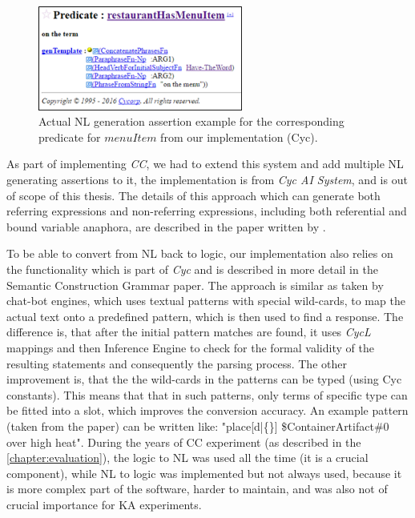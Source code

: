 \begin{figure}[h]
	\centering
		\includegraphics[width=0.6\textwidth]{figures/nlAssertion.png}
	\caption{Actual NL generation assertion example for the corresponding predicate for 
		$menuItem$ from our implementation (Cyc).}
	\label{fig:nlAssertion}
\end{figure}

As part of implementing \emph{CC}, we had
to extend this system and add multiple NL generating assertions to it, the
implementation is from \emph{Cyc AI System}, and is out of scope of this 
thesis. The details of this approach which can generate both referring 
expressions and non-referring expressions, including both referential and 
bound variable anaphora, are described in the paper written by
\textcite{Coppock2010}. 

To be able to convert from NL back to logic, our implementation also relies on
the functionality which is part of \emph{Cyc} and is described in more detail
in the Semantic Construction Grammar paper\parencite{Schneider2015}. The 
approach is similar as
taken by chat-bot engines\parencite{Wilcox2011}, which uses textual patterns
with special wild-cards, to map the actual text onto a predefined pattern, which
is then used to find a response. The difference is, that after the initial 
pattern matches are found, it uses \emph{CycL} mappings and then Inference 
Engine to check for
the formal validity of the resulting statements and consequently the parsing 
process. The other improvement is, that the the wild-cards in the patterns
can be typed (using Cyc constants). This means that that in such patterns, 
only terms of specific type can be fitted into a slot, which improves the 
conversion accuracy. An example pattern (taken from the paper) can be written 
like: "place[d|\{\}] \$ContainerArtifact\#0 over high heat".
During the years of CC experiment (as described in the 
\autoref{chapter:evaluation}), the logic to NL was used all the time (it is a
crucial component), while NL to logic was implemented but not always used, 
because it is more complex part of the software, harder to maintain, and was
also not of crucial importance for KA experiments.

